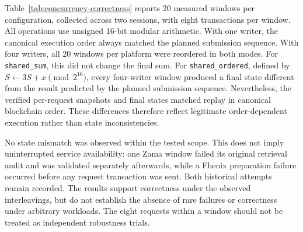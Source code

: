 Table~\ref{tab:concurrency-correctness} reports 20 measured windows per configuration, collected across two sessions, with eight transactions per window. All operations use unsigned 16-bit modular arithmetic. With one writer, the canonical execution order always matched the planned submission sequence. With four writers, all 20 windows per platform were reordered in both modes. For \texttt{shared\_sum}, this did not change the final sum. For \texttt{shared\_ordered}, defined by $S\leftarrow 3S+x\pmod{2^{16}}$, every four-writer window produced a final state different from the result predicted by the planned submission sequence. Nevertheless, the verified per-request snapshots and final states matched replay in canonical blockchain order. These differences therefore reflect legitimate order-dependent execution rather than state inconsistencies.

No state mismatch was observed within the tested scope. This does not imply uninterrupted service availability: one Zama window failed its original retrieval audit and was validated separately afterwards, while a Fhenix preparation failure occurred before any request transaction was sent. Both historical attempts remain recorded. The results support correctness under the observed interleavings, but do not establish the absence of rare failures or correctness under arbitrary workloads. The eight requests within a window should not be treated as independent robustness trials.
